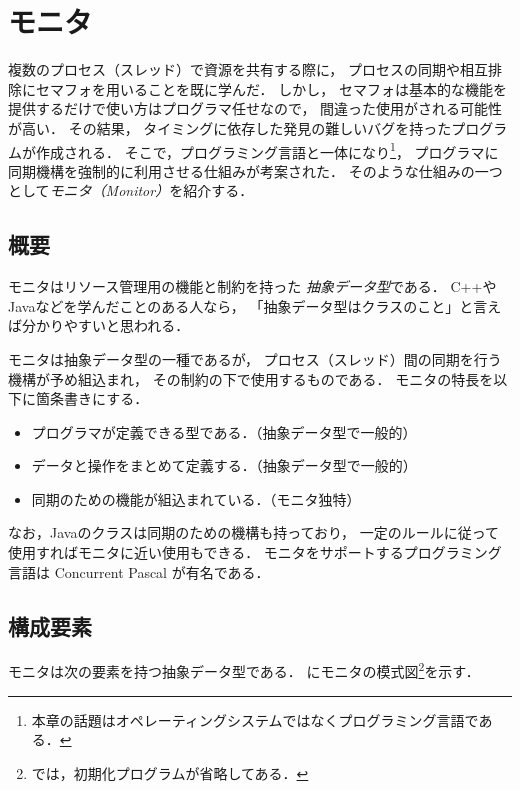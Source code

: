 \chapter{モニタ}
\label{monitor}
複数のプロセス（スレッド）で資源を共有する際に，
プロセスの同期や相互排除にセマフォを用いることを既に学んだ．
しかし，
セマフォは基本的な機能を提供するだけで使い方はプログラマ任せなので，
間違った使用がされる可能性が高い．
その結果，
タイミングに依存した発見の難しいバグを持ったプログラムが作成される．
そこで，プログラミング言語と一体になり\footnote{
  本章の話題はオペレーティングシステムではなくプログラミング言語である．}，
プログラマに同期機構を強制的に利用させる仕組みが考案された．
そのような仕組みの一つとして\emph{モニタ（Monitor）}を紹介する．

\section{概要}
モニタはリソース管理用の機能と制約を持った
\emph{抽象データ型}\cite{AbstractDataType}である．
C++やJavaなどを学んだことのある人なら，
「抽象データ型はクラスのこと」と言えば分かりやすいと思われる．

モニタは抽象データ型の一種であるが，
プロセス（スレッド）間の同期を行う機構が予め組込まれ，
その制約の下で使用するものである．
モニタの特長を以下に箇条書きにする．

\begin{itemize}
\item プログラマが定義できる型である．（抽象データ型で一般的）
\item データと操作をまとめて定義する．（抽象データ型で一般的）
\item 同期のための機能が組込まれている．（モニタ独特）
\end{itemize}

なお，Javaのクラスは同期のための機構も持っており，
一定のルールに従って使用すればモニタに近い使用もできる．
モニタをサポートするプログラミング言語は Concurrent Pascal が有名である．

\section{構成要素}
モニタは次の要素を持つ抽象データ型である．
にモニタの模式図\footnote{
  では，初期化プログラムが省略してある．}を示す．

